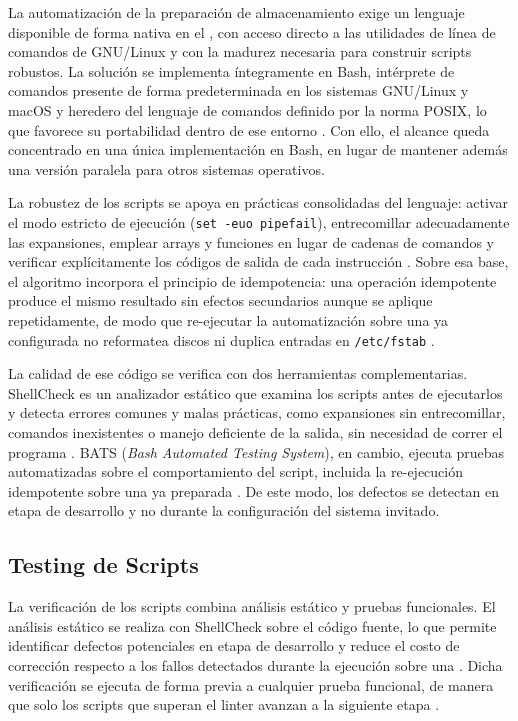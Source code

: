 La automatización de la preparación de almacenamiento exige un lenguaje disponible de forma nativa en el \host{}, con acceso directo a las utilidades de línea de comandos de GNU/Linux y con la madurez necesaria para construir scripts robustos. La solución se implementa íntegramente en Bash, intérprete de comandos presente de forma predeterminada en los sistemas GNU/Linux y macOS y heredero del lenguaje de comandos definido por la norma POSIX, lo que favorece su portabilidad dentro de ese entorno \parencite{posix_shell, bash_best_practices}. Con ello, el alcance queda concentrado en una única implementación en Bash, en lugar de mantener además una versión paralela para otros sistemas operativos.

La robustez de los scripts se apoya en prácticas consolidadas del lenguaje: activar el modo estricto de ejecución (\texttt{set -euo pipefail}), entrecomillar adecuadamente las expansiones, emplear arrays y funciones en lugar de cadenas de comandos y verificar explícitamente los códigos de salida de cada instrucción \parencite{bash_best_practices}. Sobre esa base, el algoritmo incorpora el principio de idempotencia: una operación idempotente produce el mismo resultado sin efectos secundarios aunque se aplique repetidamente, de modo que re-ejecutar la automatización sobre una \vm{} ya configurada no reformatea discos ni duplica entradas en \texttt{/etc/fstab} \parencite{idempotency_concept, ansible_up_running}.

La calidad de ese código se verifica con dos herramientas complementarias. ShellCheck es un analizador estático que examina los scripts antes de ejecutarlos y detecta errores comunes y malas prácticas, como expansiones sin entrecomillar, comandos inexistentes o manejo deficiente de la salida, sin necesidad de correr el programa \parencite{shellcheck}. BATS (\textit{Bash Automated Testing System}), en cambio, ejecuta pruebas automatizadas sobre el comportamiento del script, incluida la re-ejecución idempotente sobre una \vm{} ya preparada \parencite{bats_testing}. De este modo, los defectos se detectan en etapa de desarrollo y no durante la configuración del sistema invitado.

\subsection{Testing de Scripts}

La verificación de los scripts combina análisis estático y pruebas funcionales. El análisis estático se realiza con ShellCheck sobre el código fuente, lo que permite identificar defectos potenciales en etapa de desarrollo y reduce el costo de corrección respecto a los fallos detectados durante la ejecución sobre una \vm{} \parencite{shellcheck}. Dicha verificación se ejecuta de forma previa a cualquier prueba funcional, de manera que solo los scripts que superan el linter avanzan a la siguiente etapa \parencite{bash_best_practices}.

